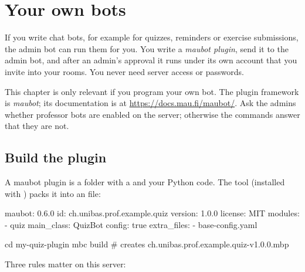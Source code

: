 \chapter{Your own bots}
\label{ch:bots}

If you write chat bots, for example for quizzes, reminders or exercise submissions, the
admin bot can run them for you. You write a \emph{maubot plugin}, send it to the admin bot,
and after an admin's approval it runs under its own account that you invite into your
rooms. You never need server access or passwords.

\begin{note}
This chapter is only relevant if you program your own bot. The plugin framework is
\emph{maubot}; its documentation is at \url{https://docs.mau.fi/maubot/}. Ask the admins
whether professor bots are enabled on the server; otherwise the  commands answer
that they are not.
\end{note}

\section{Build the plugin}

A maubot plugin is a folder with a  and your Python code. The tool
 (installed with ) packs it into an  file:

\begin{codefile}
maubot: 0.6.0
id: ch.unibas.prof.example.quiz
version: 1.0.0
license: MIT
modules:
  - quiz
main_class: QuizBot
config: true
extra_files:
  - base-config.yaml
\end{codefile}

\begin{codefile}[terminal]
cd my-quiz-plugin
mbc build          # creates ch.unibas.prof.example.quiz-v1.0.0.mbp
\end{codefile}

Three rules matter on this server:

